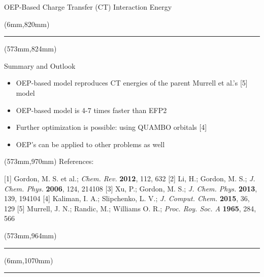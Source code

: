 \documentclass[final]{beamer} %
\begin{document}
\begin{frame}{OEP-Based Charge Transfer (CT) Interaction Energy}
\begin{textblock*}{820mm}(6mm,820mm)
\noindent\rule{83cm}{5.4pt}
\end{textblock*}

\begin{textblock*}{257mm}(573mm,824mm)
\begin{block}{Summary and Outlook}
 \begin{itemize}
   \item OEP-based model reproduces CT energies of the parent Murrell et al.'s [5] model
   \item OEP-based model is 4-7 times faster than EFP2
   \item Further optimization is possible: using QUAMBO orbitals [4]
   \item OEP's can be applied to other problems as well
 \end{itemize}
\end{block}
\end{textblock*}

\begin{textblock*}{257mm}(573mm,970mm)
    References: %
    \begin{small}
[1] Gordon, M. S. et al.; \emph{Chem. Rev.} {\bf 2012}, 112, 632 
[2] Li, H.; Gordon, M. S.; \emph{J. Chem. Phys.} {\bf 2006}, 124, 214108
[3] Xu, P.; Gordon, M. S.; \emph{J. Chem. Phys.} {\bf 2013}, 139, 194104
[4] Kaliman, I. A.; Slipchenko, L. V.; \emph{J. Comput. Chem.} {\bf 2015}, 36, 129
[5] Murrell, J. N.; Randic, M.; Williams O. R.; \emph{Proc. Roy. Soc. A} {\bf 1965}, 284, 566
    \end{small}         
\end{textblock*}
\begin{textblock*}{257mm}(573mm,964mm)
\noindent\rule{83cm}{5.4pt}
\end{textblock*}




\begin{textblock*}{820mm}(6mm,1070mm)
\noindent\rule{83cm}{5.4pt}
\end{textblock*}



\end{frame}
\end{document}
